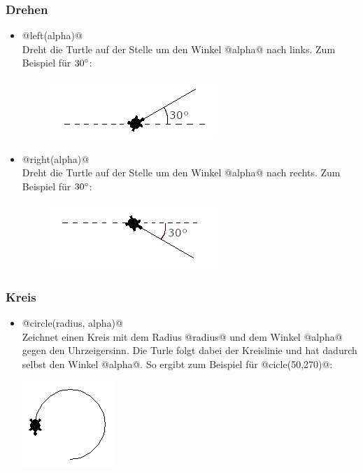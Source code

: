     \subsubsection*{Drehen}
    \begin{itemize}
        \item 
        @left(alpha)@\\
        Dreht die Turtle auf der Stelle um den Winkel @alpha@ nach links. Zum Beispiel für $30\degree$:
        \begin{figure}[H]
            \centering
            \includegraphics[scale = 0.8]{img/left}
        \end{figure}

        \item 
        @right(alpha)@\\
        Dreht die Turtle auf der Stelle um den Winkel @alpha@ nach rechts. Zum Beispiel für $30\degree$:
        \begin{figure}[H]
            \centering
            \includegraphics[scale = 0.8]{img/right}
        \end{figure}
    \end{itemize}
    
    \subsubsection*{Kreis}
    \begin{itemize}
        \item
        @circle(radius, alpha)@ \\
        Zeichnet einen Kreis mit dem Radius @radius@ und dem Winkel @alpha@ gegen den Uhrzeigersinn. Die Turle folgt dabei der
        Kreislinie und hat dadurch selbst den Winkel @alpha@. So ergibt zum Beispiel für @cicle(50,270)@: 
        \begin{center}
            \includegraphics[scale = 0.8]{img/circle}
        \end{center}
    \end{itemize}

